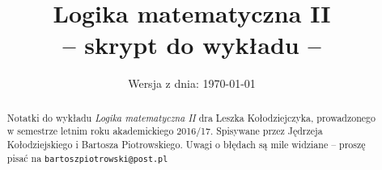 \documentclass{article}
\title{\textbf{Logika matematyczna II} \\ -- skrypt do wykładu --}
\date{\small{Wersja z dnia: \today}}
\begin{document}
\maketitle

\newcommand{\N}{\mathbb{N}}
\newcommand{\Z}{\mathbb{Z}}
\newcommand{\Q}{\mathbb{Q}}
\newcommand{\R}{\mathbb{R}}
\newcommand{\C}{\mathbb{C}}

\newcommand{\X}{\mathcal{X}}
\newcommand{\Y}{\mathcal{Y}}

\newtheorem{thm}{Thm}[section]
\theoremstyle{plain}
\newtheorem{tw}[thm]{Twierdzenie}
\newtheorem{stw}[thm]{Stwierdzenie}
\newtheorem{wn}[thm]{Wniosek}
\newtheorem{lem}[thm]{Lemat}
\newtheorem{teza}[thm]{Teza}
\newtheorem{fakt}[thm]{Fakt}

\theoremstyle{definition}
\newtheorem{df}[thm]{Definicja}
\newtheorem{oznn}[thm]{Oznaczenia}
\newtheorem{ozn}[thm]{Oznaczenie}

\theoremstyle{remark}
\newtheorem{prz}[thm]{Przykład}
\newtheorem{uw}[thm]{Uwaga}
\newtheorem{przyp}[thm]{Przypomnienie}
\newtheorem{zd}{Zadanie}

\newcommand{\PA}{\mathsf{P \mkern-1.9mu A}}
\newcommand{\ZFC}{\mathsf{Z \mkern-1.8mu F \mkern-1.5mu C}}
\newcommand{\DLO}{\mathsf{D \mkern-1.5mu L \mkern-1.8mu O}}

\newcommand{\wtw}{wtedy i tylko wtedy, gdy }
\newcommand{\fae}{następujące warunki są równoważne: }
\newcommand{\Fae}{Następujące warunki są równoważne: }

\newcommand{\Th}{\text{Th}}


\begin{abstract}
	Notatki do wykładu \textit{Logika matematyczna II} dra Leszka Kołodziejczyka, prowadzonego w semestrze letnim roku akademickiego 2016/17.
	Spisywane przez Jędrzeja Kołodziejskiego i Bartosza Piotrowskiego.
	Uwagi o błędach są mile widziane -- proszę pisać na \texttt{bartoszpiotrowski@post.pl}
\end{abstract}
\end{document}

